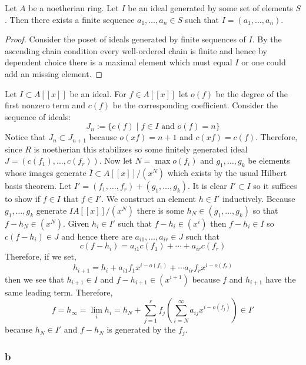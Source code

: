 \documentclass[12pt]{article}
\begin{document}
\begin{lemma}
Let $A$ be a noetherian ring. Let $I$ be an ideal generated by some set of elements $S$. Then there exists a finite sequence $a_1, \dots, a_n \in S$ such that $I = (a_1, \dots, a_n)$.
\end{lemma}

\begin{proof}
Consider the poset of ideals generated by finite sequences of $I$. By the ascending chain condition every well-ordered chain is finite and hence by dependent choice there is a maximal element which must equal $I$ or one could add an missing element.
\end{proof}

Let $I \subset A[[x]]$ be an ideal.
For $f \in A[[x]]$ let $o(f)$ be the degree of the first nonzero term and $c(f)$ be the corresponding coefficient. Consider the sequence of ideals:
\[ J_n := \{ c(f) \mid f \in I \text{ and } o(f) = n \} \]
Notice that $J_n \subset J_{n+1}$ because $o(xf) = n+1$ and $c(xf) = c(f)$. Therefore, since $R$ is noetherian this stabilizes so some finitely generated ideal $J = (c(f_1), \dots, c(f_r))$. Now let $N = \max o(f_i)$ and $g_1, \dots, g_k$ be elements whose images generate $\bar{I} \subset A[[x]]/(x^N)$ which exists by the usual Hilbert basis theorem. Let $I' = (f_1, \dots, f_r) + (g_1, \dots, g_k)$. It is clear $I' \subset I$ so it suffices to show if $f \in I$ that $f \in I'$. We construct an element $h \in I'$ inductively. Because $g_1, \dots, g_k$ generate $I A[[x]]/(x^N)$ there is some $h_N \in (g_1, \dots, g_k)$ so that $f - h_N \in (x^N)$. Given $h_i \in I'$ such that $f - h_i \in (x^i)$ then $f - h_i \in I$ so $c(f - h_i) \in J$ and hence there are $a_{i1}, \dots, a_{ir} \in J$ such that 
\[ c(f - h_i) = a_{i1} c(f_1) + \cdots + a_{ir} c(f_r) \]
Therefore, if we set,
\[ h_{i+1} = h_i + a_{i1} f_1 x^{i - o(f_1)} + \cdots a_{ir} f_r x^{i - o(f_r)} \]
then we see that $h_{i+1} \in I$ and $f - h_{i+1} \in (x^{i+1})$ because $f$ and $h_{i+1}$ have the same leading term. Therefore, 
\[ f = h_{\infty} = \lim_{i} h_i = h_N + \sum_{j = 1}^r f_j \left( \sum_{i = N}^\infty a_{ij} x^{i - o(f_j)} \right) \in I' \]
because $h_N \in I'$ and $f - h_N$ is generated by the $f_j$.


\subsubsection{b}
\end{document}
